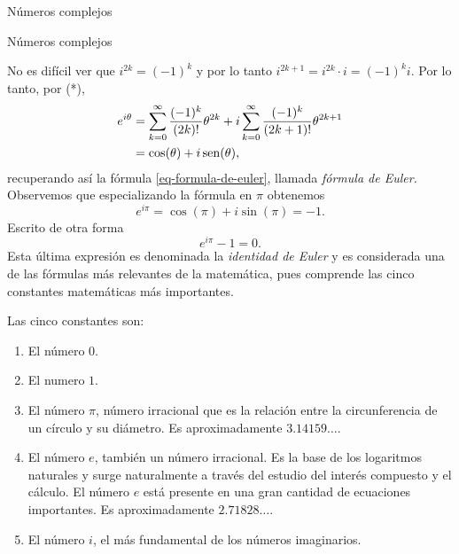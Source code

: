\begin{chapter}{N\'umeros complejos}
\begin{section}{N\'umeros complejos}
\begin{observacion*}
        No es difícil ver que $i^{2k} = (-1)^k$ y por lo tanto $i^{2k+1} = i^{2k}\cdot i = (-1)^ki $. Por lo tanto, por (*), 
        \begin{align*}
            e^{i\theta} &=  \sum_{k=0}^{\infty} \frac{(-1)^k}{(2k)!}\theta^{2k}  + i\sum_{k=0}^{\infty} \frac{ (-1)^k}{(2k+1)!}\theta^{2k+1} \\
            &=\cos(\theta) + i \operatorname{sen}(\theta), 
        \end{align*}
        recuperando así  la fórmula \eqref{eq-formula-de-euler}, llamada \emph{fórmula de Euler.} Observemos que especializando la fórmula en $\pi$ obtenemos 
        \begin{equation*}
                e^{i\pi} = \cos(\pi) + i\sin(\pi) = -1.
        \end{equation*}
        Escrito de otra forma
        \begin{equation}
            e^{i\pi} -1 =0.
        \end{equation}
        Esta última expresión es denominada la \emph{identidad de Euler} y es considerada una de las fórmulas más relevantes de la matemática, pues comprende las cinco constantes matemáticas más importantes. 
        
        Las cinco constantes son:
        \begin{enumerate}
            \item El número \boldmath${0}$.
            \item El numero \boldmath${1}$.
            \item El número \boldmath${\pi}$, número irracional  que es la relación entre la circunferencia de un círculo y su diámetro. Es aproximadamente $3.14159\ldots$.
            \item El número \boldmath${e}$, también un número irracional. Es la base de los logaritmos naturales y surge naturalmente a través del estudio del interés compuesto y el cálculo. El número $e$ está presente en una gran cantidad de ecuaciones importantes. Es aproximadamente $2.71828\ldots$.
            \item El número \boldmath$i$, el más fundamental de los números imaginarios.
            
        \end{enumerate}
        
        
        \end{observacion*}
        
        
        
    \end{section}	
    \end{chapter}




